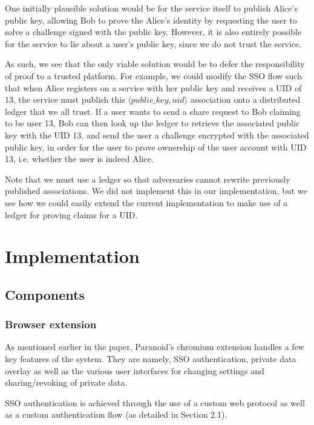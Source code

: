 \documentclass[letterpaper,twocolumn,10pt]{article}
\begin{document}
One initially plausible solution would be for the service itself to publish Alice's public key, allowing Bob to prove the Alice's identity by requesting the user to solve a challenge signed with the public key. However, it is also entirely possible for the service to lie about a user's public key, since we do not trust the service.

As such, we see that the only viable solution would be to defer the responsibility of proof to a trusted platform. For example, we could modify the SSO flow such that when Alice registers on a service with her public key and receives a UID of 13, the service must publish this $\langle public\_key, uid \rangle$ association onto a distributed ledger that we all trust. If a user wants to send a share request to Bob claiming to be user 13, Bob can then look up the ledger to retrieve the associated public key with the UID 13, and send the user a challenge encrypted with the associated public key, in order for the user to prove ownership of the user account with UID 13, i.e. whether the user is indeed Alice.

Note that we must use a ledger so that adversaries cannot rewrite previously published associations. We did not implement this in our implementation, but we see how we could easily extend the current implementation to make use of a ledger for proving claims for a UID.

\section{Implementation}


\subsection{Components}


\subsubsection{Browser extension}

As mentioned earlier in the paper, Paranoid's chromium extension handles a few key features of the system. They are namely, SSO authentication, private data overlay as well as the various user interfaces for changing settings and sharing/revoking of private data.

SSO authentication is achieved through the use of a custom web protocol as well as a custom authentication flow (as detailed in Section 2.1). 
\end{document}
